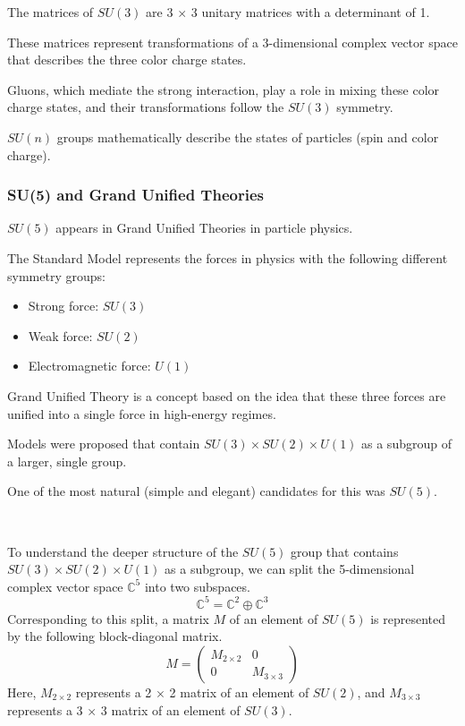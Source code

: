 \documentclass[uplatex,a4j,12pt,dvipdfmx]{jsarticle}
\begin{document}
The matrices of $SU(3)$ are 3 $\times$ 3 unitary matrices with a determinant of 1.

These matrices represent transformations of a 3-dimensional complex vector space that describes the three color charge states.

Gluons, which mediate the strong interaction, play a role in mixing these color charge states, and their transformations follow the $SU(3)$ symmetry.

$SU(n)$ groups mathematically describe the states of particles (spin and color charge).

\subsubsection{\textbf{SU(5) and Grand Unified Theories}}

$SU(5)$ appears in Grand Unified Theories in particle physics.

The Standard Model represents the forces in physics with the following different symmetry groups:
\begin{itemize}
	\item Strong force: $SU(3)$
	\item Weak force: $SU(2)$
	\item Electromagnetic force: $U(1)$
\end{itemize}

Grand Unified Theory is a concept based on the idea that these three forces are unified into a single force in high-energy regimes.

Models were proposed that contain $SU(3) \times SU(2) \times U(1)$ as a subgroup of a larger, single group.

One of the most natural (simple and elegant) candidates for this was $SU(5)$.

\ \ 

To understand the deeper structure of the $SU(5)$ group that contains $SU(3) \times SU(2) \times U(1)$ as a subgroup, we can split the 5-dimensional complex vector space $\mathbb{C}^{5}$ into two subspaces.
$$ \mathbb{C}^{5} = \mathbb{C}^{2} \oplus \mathbb{C}^{3} $$
Corresponding to this split, a matrix $M$ of an element of $SU(5)$ is represented by the following block-diagonal matrix.
$$
	M =
	\left(
	\begin{array}{cc}
			M_{2 \times 2} & 0 \\
			0 & M_{3 \times 3}
		\end{array}
	\right)
$$
Here, $M_{2 \times 2}$ represents a 2 $\times$ 2 matrix of an element of $SU(2)$, and
$M_{3 \times 3}$ represents a 3 $\times$ 3 matrix of an element of $SU(3)$.
\end{document}
